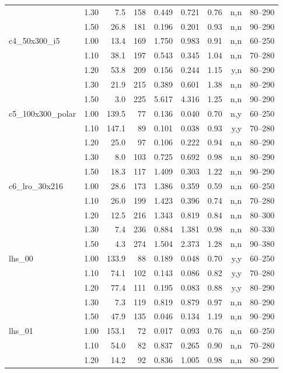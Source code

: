\begin{longtable}{@{}l r r r r r r r r@{}}
 & 1.30 & 7.5 & 158 & 0.449 & 0.721 & 0.76 & n,n & 80--290 \\
 & 1.50 & 26.8 & 181 & 0.196 & 0.201 & 0.93 & n,n & 90--290 \\
\addlinespace
c4\_50x300\_i5 & 1.00 & 13.4 & 169 & 1.750 & 0.983 & 0.91 & n,n & 60--250 \\
 & 1.10 & 38.1 & 197 & 0.543 & 0.345 & 1.04 & n,n & 70--280 \\
 & 1.20 & 53.8 & 209 & 0.156 & 0.244 & 1.15 & y,n & 80--290 \\
 & 1.30 & 21.9 & 215 & 0.389 & 0.601 & 1.38 & n,n & 80--290 \\
 & 1.50 & 3.0 & 225 & 5.617 & 4.316 & 1.25 & n,n & 90--290 \\
\addlinespace
c5\_100x300\_polar & 1.00 & 139.5 & 77 & 0.136 & 0.040 & 0.70 & n,y & 60--250 \\
 & 1.10 & 147.1 & 89 & 0.101 & 0.038 & 0.93 & y,y & 70--280 \\
 & 1.20 & 25.0 & 97 & 0.106 & 0.222 & 0.94 & n,n & 80--290 \\
 & 1.30 & 8.0 & 103 & 0.725 & 0.692 & 0.98 & n,n & 80--290 \\
 & 1.50 & 18.3 & 117 & 1.409 & 0.303 & 1.22 & n,n & 90--290 \\
\addlinespace
c6\_lro\_30x216 & 1.00 & 28.6 & 173 & 1.386 & 0.359 & 0.59 & n,n & 60--250 \\
 & 1.10 & 26.0 & 199 & 1.423 & 0.396 & 0.74 & n,n & 70--280 \\
 & 1.20 & 12.5 & 216 & 1.343 & 0.819 & 0.84 & n,n & 80--300 \\
 & 1.30 & 7.4 & 236 & 0.884 & 1.381 & 0.98 & n,n & 80--330 \\
 & 1.50 & 4.3 & 274 & 1.504 & 2.373 & 1.28 & n,n & 90--380 \\
\addlinespace
lhs\_00 & 1.00 & 133.9 & 88 & 0.189 & 0.048 & 0.70 & y,y & 60--250 \\
 & 1.10 & 74.1 & 102 & 0.143 & 0.086 & 0.82 & y,y & 70--280 \\
 & 1.20 & 77.4 & 111 & 0.195 & 0.083 & 0.88 & y,y & 80--290 \\
 & 1.30 & 7.3 & 119 & 0.819 & 0.879 & 0.97 & n,n & 80--290 \\
 & 1.50 & 47.9 & 135 & 0.046 & 0.134 & 1.19 & n,n & 90--290 \\
\addlinespace
lhs\_01 & 1.00 & 153.1 & 72 & 0.017 & 0.093 & 0.76 & n,n & 60--250 \\
 & 1.10 & 54.0 & 82 & 0.837 & 0.265 & 0.90 & n,n & 70--280 \\
 & 1.20 & 14.2 & 92 & 0.836 & 1.005 & 0.98 & n,n & 80--290 \\

\end{longtable}
